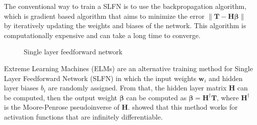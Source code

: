 The conventional way to train a SLFN is to use the backpropagation algorithm,
which is gradient based algorithm that aims to minimize the error $\left\lVert
    \textbf{T} - \textbf{H}\boldsymbol\beta \right\rVert$ by iteratively updating
the weights and biases of the network. This algorithm is computationally
expensive and can take a long time to converge.

\begin{figure}[htpb]
    \caption{Single layer feedforward network}%
\end{figure}

Extreme Learning Machines (ELMs) are an alternative training method for Single
Layer Feedforward Network (SLFN) in which the input weights $\textbf{w}_i$ and
hidden layer biases $b_i$ are randomly assigned. From that, the hidden layer
matrix $\textbf{H}$ can be computed, then the output weight $\boldsymbol\beta$
can be computed as $\boldsymbol\beta = \textbf{H}^{\dagger} \textbf{T}$, where
$\textbf{H}^{\dagger}$ is the Moore-Penrose pseudoinverse of $\textbf{H}$.
\Textcite{huangExtremeLearningMachine2006} showed that this method works for
activation functions that are infinitely differentiable.

